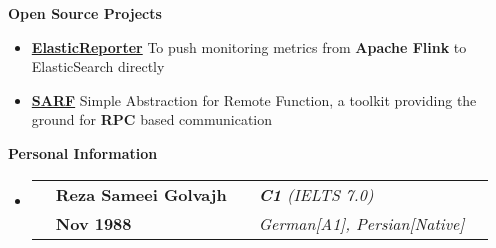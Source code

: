 \documentclass[letterpaper,12pt]{article}[leftmargin=*]
\makeatletter
\def \entryspacing {-0pt}
\renewcommand{\section}[2]{\vspace{5pt}
  \colorbox{secondary}{\color{white}\raggedbottom\normalsize\textbf{{#1}{\hspace{7pt}#2}}}
}
\newcommand{\resumeEntryStart}{\begin{itemize}[leftmargin=2.5mm]}
\newcommand{\resumeEntryEnd}{\end{itemize}\vspace{\entryspacing}}
\newcommand{\aboutMeEntryTSDL}[4]{
  \vspace{-1pt}\item[]
    \begin{tabular*}{0.97\textwidth}{l@{\extracolsep{\fill}}lrlr}
	  \color{primary}{Full name} & \textbf{\color{accent}#1} &
	  \color{primary}{English Fluency} & \textit{\color{accent}#3} \\
	  \color{primary}{Date of Birth} & \textbf{\color{accent}#2} &
	  \color{primary}{Other Languages} & \textit{\color{accent}#4} \\
    \end{tabular*}\vspace{-6pt}
}
\newcommand{\resumeEntryS}[2]{
  \item[]\small{
    \textbf{\color{primary}#1 }{ #2 \vspace{-6pt}}
  }
}
\makeatother
\begin{document}
\section{\faFolderOpen}{Open Source Projects}
	\resumeEntryStart
		\resumeEntryS{\href{https://github.com/sameei/elasticreporter}{ElasticReporter}} {To push monitoring metrics from \textbf{Apache Flink} to ElasticSearch directly}
		\resumeEntryS{\href{https://github.com/sameei/SARF}{SARF}} {Simple Abstraction for Remote Function, a toolkit providing the ground for \textbf{RPC} based communication}
	\resumeEntryEnd
	

\section{\faUser}{Personal Information}
    \resumeEntryStart
      \aboutMeEntryTSDL
	  	{Reza Sameei Golvajh}{Nov 1988}{\textbf{C1} (IELTS 7.0)}{German[A1], Persian[Native]}
    \resumeEntryEnd
  
\end{document}
